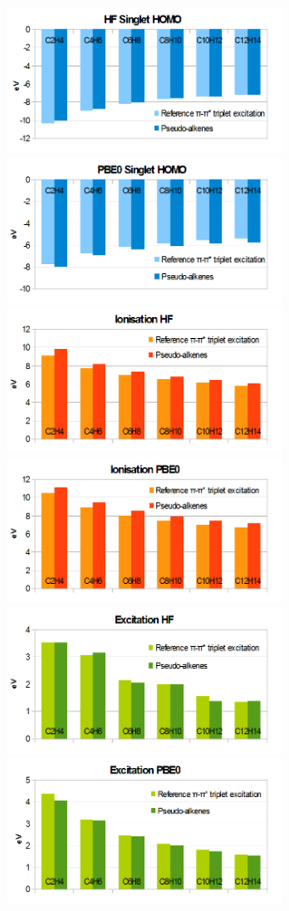 \documentclass[journal=jctcce,manuscript=article]{achemso}
\begin{document}
\begin{figure}[ht]
\includegraphics[width=8cm]{hf_homo}
\includegraphics[width=8cm]{pbe0_homo}
\includegraphics[width=8cm]{hf_ionisation}
\includegraphics[width=8cm]{pbe0_ionisation}
\includegraphics[width=8cm]{hf_excitation}
\includegraphics[width=8cm]{pbe0_excitation}

\end{figure}
\end{document}

